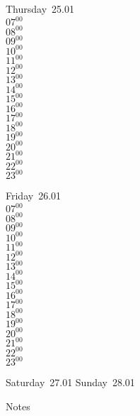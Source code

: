 \documentclass[11pt, a4paper]{book}\usepackage[]{graphicx}\usepackage[]{color}
\begin{document}
\begin{weekdaybox}
  Thursday~25.01\\
  { 
  \vfill
  $07^{00}$\\
$08^{00}$\\
$09^{00}$\\
$10^{00}$\\
$11^{00}$\\
$12^{00}$\\
$13^{00}$\\
$14^{00}$\\
$15^{00}$\\
$16^{00}$\\
$17^{00}$\\
$18^{00}$\\
$19^{00}$\\
$20^{00}$\\
$21^{00}$\\
$22^{00}$\\
$23^{00}$\\
  }
\end{weekdaybox} 
\begin{weekdaybox}
  Friday~26.01\\
  { 
  \vfill
  $07^{00}$\\
$08^{00}$\\
$09^{00}$\\
$10^{00}$\\
$11^{00}$\\
$12^{00}$\\
$13^{00}$\\
$14^{00}$\\
$15^{00}$\\
$16^{00}$\\
$17^{00}$\\
$18^{00}$\\
$19^{00}$\\
$20^{00}$\\
$21^{00}$\\
$22^{00}$\\
$23^{00}$\\
  }
\end{weekdaybox}
\begin{weekendbox}
  Saturday~27.01
  \tcblower
  Sunday~28.01
\end{weekendbox} %
\begin{notebox}
  Notes
\end{notebox}
\clearpage
\end{document}
